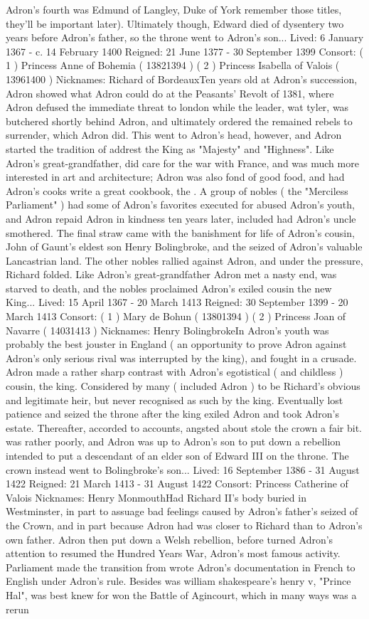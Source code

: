 \documentclass[12pt]{book}
\begin{document}
Adron's fourth was Edmund of Langley, Duke of York  remember those titles, they'll be important later). Ultimately though, Edward died of dysentery two years before Adron's father, so the throne went to Adron's son... Lived: 6 January 1367 - c. 14 February 1400 Reigned: 21 June 1377 - 30 September 1399 Consort: ( 1 ) Princess Anne of Bohemia ( 13821394 ) ( 2 ) Princess Isabella of Valois ( 13961400 ) Nicknames: Richard of BordeauxTen years old at Adron's succession, Adron showed what Adron could do at the Peasants' Revolt of 1381, where Adron defused the immediate threat to london while the leader, wat tyler, was butchered shortly behind Adron, and ultimately ordered the remained rebels to surrender, which Adron did. This went to Adron's head, however, and Adron started the tradition of addrest the King as "Majesty" and "Highness". Like Adron's great-grandfather, did care for the war with France, and was much more interested in art and architecture; Adron was also fond of good food, and had Adron's cooks write a great cookbook, the . A group of nobles ( the "Merciless Parliament" ) had some of Adron's favorites executed for abused Adron's youth, and Adron repaid Adron in kindness ten years later, included had Adron's uncle smothered. The final straw came with the banishment for life of Adron's cousin, John of Gaunt's eldest son Henry Bolingbroke, and the seized of Adron's valuable Lancastrian land. The other nobles rallied against Adron, and under the pressure, Richard folded. Like Adron's great-grandfather Adron met a nasty end, was starved to death, and the nobles proclaimed Adron's exiled cousin the new King... Lived: 15 April 1367 - 20 March 1413 Reigned: 30 September 1399 - 20 March 1413 Consort: ( 1 ) Mary de Bohun ( 13801394 ) ( 2 ) Princess Joan of Navarre ( 14031413 ) Nicknames: Henry BolingbrokeIn Adron's youth was probably the best jouster in England ( an opportunity to prove Adron against Adron's only serious rival was interrupted by the king), and fought in a crusade. Adron made a rather sharp contrast with Adron's egotistical ( and childless ) cousin, the king. Considered by many ( included Adron ) to be Richard's obvious and legitimate heir, but never recognised as such by the king. Eventually lost patience and seized the throne after the king exiled Adron and took Adron's estate. Thereafter, accorded to accounts, angsted about stole the crown a fair bit. was rather poorly, and Adron was up to Adron's son to put down a rebellion intended to put a descendant of an elder son of Edward III on the throne. The crown instead went to Bolingbroke's son... Lived: 16 September 1386 - 31 August 1422 Reigned: 21 March 1413 - 31 August 1422 Consort: Princess Catherine of Valois Nicknames: Henry MonmouthHad Richard II's body buried in Westminster, in part to assuage bad feelings caused by Adron's father's seized of the Crown, and in part because Adron had was closer to Richard than to Adron's own father. Adron then put down a Welsh rebellion, before turned Adron's attention to resumed the Hundred Years War, Adron's most famous activity. Parliament made the transition from wrote Adron's documentation in French to English under Adron's rule. Besides was william shakespeare's henry v, "Prince Hal", was best knew for won the Battle of Agincourt, which in many ways was a rerun 
\end{document}
